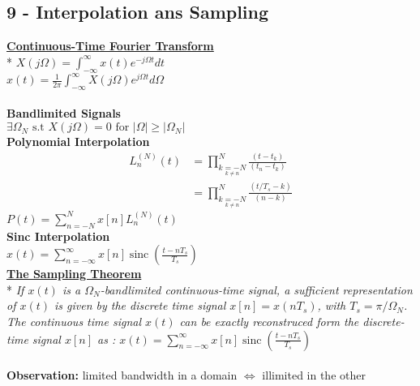 \documentclass{article}
\newcommand{\para}[1]{\textbf{\underline{#1}}\\*} %
\newcommand{\subpara}[1]{\textbf{#1}}
\begin{document}
\begin{multicols}{3}
\end{multicols}




\subsection{9 - Interpolation ans Sampling} 
\begin{multicols}{2}
\para{Continuous-Time Fourier Transform}
$X(j\Omega) = \int_{-\infty}^\infty x(t) e^{-j\Omega t} dt$\\
$x(t) =\frac 1{2\pi} \int_{-\infty}^\infty X(j\Omega) e^{j\Omega t} d\Omega$\\ 
\\\subpara{Bandlimited Signals}\\
$\exists \Omega_N \text{ s.t }X(j\Omega)=0 \text{ for } |\Omega| \geq |\Omega_N|$\\
\subpara{Polynomial Interpolation}
\begin{align*}
L_n^{(N)}(t) &= \prod_{\underset{k\neq n}{k=-N}}^N \frac{(t-t_k)}{(t_n-t_k)} \\&= \prod_{\underset{k\neq n}{k=-N}}^N \frac{(t/T_s-k)}{(n-k)}
\end{align*}
$\displaystyle P(t) = \sum_{n=-N}^N x[n]L_n^{(N)}(t)$\\
\subpara{Sinc Interpolation}\\
$\displaystyle x(t) = \sum_{n=-\infty}^\infty x[n]\operatorname{sinc}\left ( \frac{t- nT_s}{T_s} \right ) $\\
\para{The Sampling Theorem}
\textit{If $x(t)$ is a $\Omega_N$-bandlimited continuous-time signal, a sufficient representation of $x(t)$ is given by the discrete time signal $x[n] = x(nT_s)$, with $T_s = \pi/\Omega_N$. The continuous time signal $x(t)$ can be exactly reconstruced form the discrete-time signal $x[n]$ as : $\displaystyle x(t) = \sum_{n=-\infty}^\infty x[n]\operatorname{sinc}\left ( \frac{t- nT_s}{T_s} \right )$
}
\\
\\ \subpara{Observation: }limited bandwidth in a domain $\Leftrightarrow$ illimited in the other  
\end{multicols}

\end{document}
